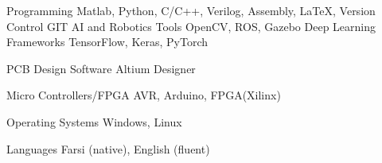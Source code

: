 

\begin{cvskills}



  
  \cvskill
    {Programming} %
    {Matlab, Python, C/C++, Verilog, Assembly, \LaTeX, Version Control GIT} %
  \cvskill
    {AI and Robotics Tools} %
    {OpenCV, ROS, Gazebo} %
  \cvskill
    {Deep Learning Frameworks} %
    {TensorFlow, Keras, PyTorch } %

  \cvskill
    {PCB Design Software} %
    {Altium Designer} %


  \cvskill
    {Micro Controllers/FPGA } %
    {AVR, Arduino, FPGA(Xilinx)} %

  \cvskill
    {Operating Systems} %
    {Windows, Linux} %


  \cvskill
    {Languages} %
    {Farsi (native), English (fluent)} %

\end{cvskills}
